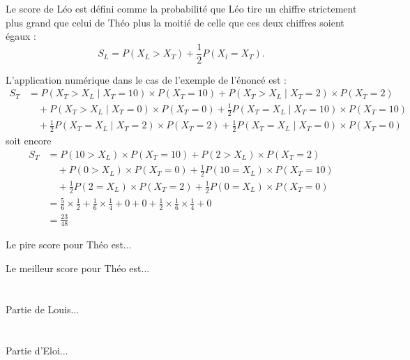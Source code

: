 \documentclass[a4paper,12pt]{article}
\begin{document}
Le score de Léo est défini comme la probabilité que Léo tire un chiffre strictement plus grand que celui de Théo plus la moitié de celle que ces deux chiffres soient égaux :
$$
    S_L = P(X_L>X_T) + \frac{1}{2}P(X_l=X_T).
$$

L'application numérique dans le cas de l'exemple de l'énoncé est :
\begin{align*}
    S_T &= P(X_T>X_L\mid X_T=10)\times P(X_T=10) + P(X_T>X_L\mid X_T=2)\times P(X_T=2)\\
    &\quad + P(X_T>X_L\mid X_T=0)\times P(X_T=0) + \frac{1}{2}P(X_T=X_L\mid X_T=10)\times P(X_T=10)\\
    &\quad + \frac{1}{2}P(X_T=X_L\mid X_T=2)\times P(X_T=2) + \frac{1}{2}P(X_T=X_L\mid X_T=0)\times P(X_T=0)
\end{align*}
soit encore
\begin{align*}
    S_T &= P(10>X_L)\times P(X_T=10) + P(2>X_L)\times P(X_T=2)\\
    &\quad + P(0>X_L)\times P(X_T=0) + \frac{1}{2}P(10=X_L)\times P(X_T=10)\\
    &\quad + \frac{1}{2}P(2=X_L)\times P(X_T=2) + \frac{1}{2}P(0=X_L)\times P(X_T=0)\\
    &= \frac{5}{6}\times\frac{1}{2} + \frac{1}{6}\times\frac{1}{4} + 0 + 0 + \frac{1}{2}\times\frac{1}{6}\times\frac{1}{4} + 0\\
    &= \frac{23}{48}
\end{align*}
\begin{tfjmenum}
    
    \item[]
    \begin{tfjmenum}
    
    \item
    Le pire score pour Théo est...

    \item Le meilleur score pour Théo est...

    \end{tfjmenum}

\end{tfjmenum}

\section{}

Partie de Louis...

\section{}

Partie d'Eloi...

\section{}


\end{document}
